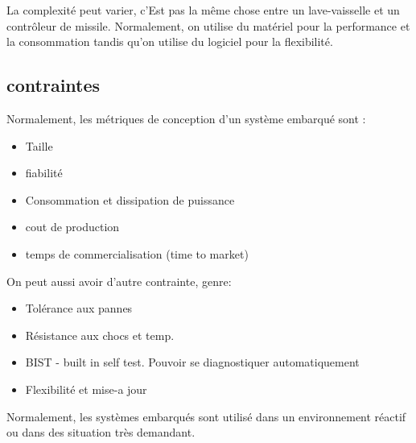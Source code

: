 \documentclass[oneside]{book}
\begin{document}
    La complexité peut varier, c'Est pas la même chose entre un lave-vaisselle et un contrôleur de missile. Normalement, on utilise du matériel pour la performance et la consommation tandis qu'on utilise du logiciel pour la flexibilité.\\
    
    \subsection{contraintes}
    Normalement, les métriques de conception d'un système embarqué sont :
    \begin{itemize}
        \item Taille
        \item fiabilité
        \item Consommation et dissipation de puissance
        \item cout de production
        \item temps de commercialisation (time to market)
    \end{itemize}

    On peut aussi avoir d'autre contrainte, genre:
    \begin{itemize}
        \item Tolérance aux pannes
        \item Résistance aux chocs et temp.
        \item BIST - built in self test. Pouvoir se diagnostiquer automatiquement
        \item Flexibilité et mise-a jour
    \end{itemize}

    Normalement, les systèmes embarqués sont utilisé dans un environnement réactif ou dans des situation très demandant.
    
\end{document}
